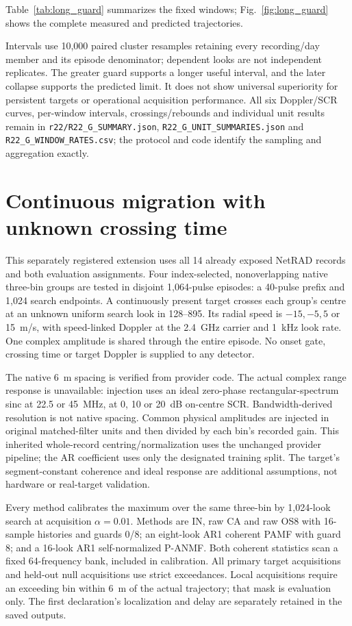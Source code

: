 \documentclass[10pt]{article}
\begin{document}
Table~\ref{tab:long_guard} summarizes the fixed windows; Fig.~\ref{fig:long_guard} shows the complete measured and predicted trajectories.

Intervals use 10,000 paired cluster resamples retaining every recording/day member and its episode denominator; dependent looks are not independent replicates. The greater guard supports a longer useful interval, and the later collapse supports the predicted limit. It does not show universal superiority for persistent targets or operational acquisition performance. All six Doppler/SCR curves, per-window intervals, crossings/rebounds and individual unit results remain in \texttt{r22/R22\_G\_SUMMARY.json}, \texttt{R22\_G\_UNIT\_SUMMARIES.json} and \texttt{R22\_G\_WINDOW\_RATES.csv}; the protocol and code identify the sampling and aggregation exactly.


\section{Continuous migration with unknown crossing time}\label{sup:migration}
This separately registered extension uses all 14 already exposed NetRAD records and both evaluation assignments. Four index-selected, nonoverlapping native three-bin groups are tested in disjoint 1,064-pulse episodes: a 40-pulse prefix and 1,024 search endpoints. A continuously present target crosses each group's centre at an unknown uniform search look in 128--895. Its radial speed is $-15,-5,5$ or 15~m/s, with speed-linked Doppler at the 2.4~GHz carrier and 1~kHz look rate. One complex amplitude is shared through the entire episode. No onset gate, crossing time or target Doppler is supplied to any detector.

The native 6~m spacing is verified from provider code. The actual complex range response is unavailable: injection uses an ideal zero-phase rectangular-spectrum sinc at 22.5 or 45~MHz, at 0, 10 or 20~dB on-centre SCR. Bandwidth-derived resolution is not native spacing. Common physical amplitudes are injected in original matched-filter units and then divided by each bin's recorded gain. This inherited whole-record centring/normalization uses the unchanged provider pipeline; the AR coefficient uses only the designated training split. The target's segment-constant coherence and ideal response are additional assumptions, not hardware or real-target validation.

Every method calibrates the maximum over the same three-bin by 1,024-look search at acquisition $\alpha=0.01$. Methods are IN, raw CA and raw OS8 with 16-sample histories and guards 0/8; an eight-look AR1 coherent PAMF with guard 8; and a 16-look AR1 self-normalized P-ANMF. Both coherent statistics scan a fixed 64-frequency bank, included in calibration. All primary target acquisitions and held-out null acquisitions use strict exceedances. Local acquisitions require an exceeding bin within 6~m of the actual trajectory; that mask is evaluation only. The first declaration's localization and delay are separately retained in the saved outputs.
\end{document}
